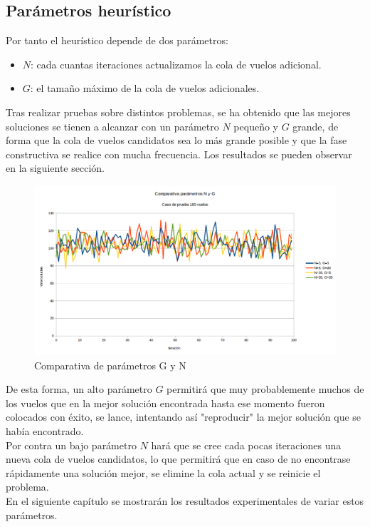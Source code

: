 \subsection{Parámetros heurístico}
Por tanto el heurístico depende de dos parámetros:
\begin{itemize}
	\item \textbf{$N$}: cada cuantas iteraciones actualizamos la cola de vuelos adicional.
	\item \textbf{$G$}: el tamaño máximo de la cola de vuelos adicionales.
\end{itemize}
Tras realizar pruebas sobre distintos problemas, se ha obtenido que las mejores soluciones se tienen a alcanzar con un parámetro $N$ pequeño y $G$ grande, de forma que la cola de vuelos candidatos sea lo más grande posible y que la fase constructiva se realice con mucha frecuencia. Los resultados se pueden observar en la siguiente sección.

\begin{figure}[H]
	\begin{center}
		\centering
		\includegraphics[width=1\textwidth]{./imagenes/heuristico/comparativa_parametros_100_vuelos.png}
		\caption{Comparativa de parámetros G y N}
		\label{fig: Comparativa de parámetros G y N}
	\end{center}
\end{figure}

De esta forma, un alto parámetro $G$ permitirá que muy probablemente muchos de los vuelos que en la mejor solución encontrada hasta ese momento fueron colocados con éxito, se lance, intentando así "reproducir" la mejor solución que se había encontrado. \\
Por contra un bajo parámetro $N$ hará que se cree cada pocas iteraciones una nueva cola de vuelos candidatos, lo que permitirá que en caso de no encontrase rápidamente una solución mejor, se elimine la cola actual y se reinicie el problema.\\
En el siguiente capítulo se mostrarán los resultados experimentales de variar estos parámetros.

